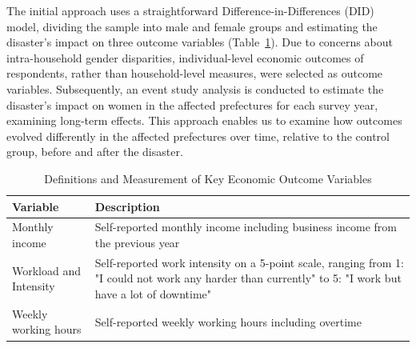 \documentclass[a4paper,12pt]{article}
\begin{document}
\begin{table}[h]
\centering
\caption{Longitudinal Sample Size by Treatment Status and Survey Year, 2009-2018}
\label{tab:distribution}

\label{table:Longitudinal_sample}

\end{table}


The initial approach uses a straightforward Difference-in-Differences (DID) model, dividing the sample into male and female groups and estimating the disaster's impact on three outcome variables (Table~\ref{table:key_outcome_variables}). Due to concerns about intra-household gender disparities, individual-level economic outcomes of respondents, rather than household-level measures, were selected as outcome variables. Subsequently, an event study analysis is conducted to estimate the disaster's impact on women in the affected prefectures for each survey year, examining long-term effects. This approach enables us to examine how outcomes evolved differently in the affected prefectures over time, relative to the control group, before and after the disaster.

\begin{table}[htbp]
\centering
\caption{Definitions and Measurement of Key Economic Outcome Variables}
\label{tab:outcome_variables}
\begin{tabular}{p{5cm}p{10cm}}
\toprule
Variable & Description \\
\midrule
Monthly income & Self-reported monthly income including business income from the previous year \\
\midrule
Workload and Intensity & Self-reported work intensity on a 5-point scale, ranging from 1: "I could not work any harder than currently" to 5: "I work but have a lot of downtime"\\
\midrule
Weekly working hours & Self-reported weekly working hours including overtime \\
\bottomrule
\end{tabular}
\label{table:key_outcome_variables}
\end{table}
\end{document}
